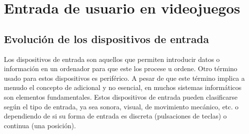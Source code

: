%
%
%
%
%
%
%
%
%
%

\chapter{Entrada de usuario en videojuegos}
\label{cap2}

\begin{FraseCelebre}
\begin{Frase}
\end{Frase}
\begin{Fuente}
\end{Fuente}
\end{FraseCelebre}


\section{Evoluci\'on de los dispositivos de entrada}

Los dispositivos de entrada son aquellos que permiten introducir datos o informaci\'on en un ordenador para que este los procese u ordene. Otro t\'ermino usado para estos dispositivos es perif\'erico. A pesar de que este t\'ermino implica a menudo el concepto de adicional y no esencial, en muchos sistemas inform\'aticos son elementos fundamentales. Estos dispositivos de entrada pueden clasificarse seg\'un el tipo de entrada, ya sea sonora, visual, de movimiento mec\'anico, etc. o dependiendo de si su forma de entrada es discreta (pulsaciones de teclas) o continua (una posici\'on).

